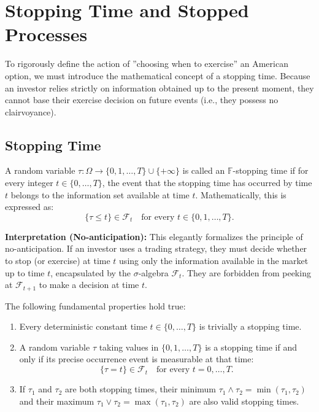 \chapter{Stopping Time and Stopped Processes}

To rigorously define the action of ''choosing when to exercise'' an American option, we must introduce the mathematical concept of a stopping time. Because an investor relies strictly on information obtained up to the present moment, they cannot base their exercise decision on future events (i.e., they possess no clairvoyance).

\section{Stopping Time}

\begin{definition}
A random variable $\tau : \Omega \to \{0, 1, \dots, T\} \cup \{+\infty\}$ is called an $\mathbb{F}$-stopping time if for every integer $t \in \{0, \dots, T\}$, the event that the stopping time has occurred by time $t$ belongs to the information set available at time $t$. Mathematically, this is expressed as:
$$ \{\tau \leq t\} \in \mathcal{F}_t \quad \text{for every } t \in \{0, 1, \dots, T\}. $$
\end{definition}

\textbf{Interpretation (No-anticipation):}
This elegantly formalizes the principle of no-anticipation. If an investor uses a trading strategy, they must decide whether to stop (or exercise) at time $t$ using only the information available in the market up to time $t$, encapsulated by the $\sigma$-algebra $\mathcal{F}_t$. They are forbidden from peeking at $\mathcal{F}_{t+1}$ to make a decision at time $t$.

\begin{proposition}
The following fundamental properties hold true:
\begin{enumerate}[label=(\alph*)]
    \item Every deterministic constant time $t \in \{0, \ldots, T\}$ is trivially a stopping time.
    \item A random variable $\tau$ taking values in $\{0, 1, \dots, T\}$ is a stopping time if and only if its precise occurrence event is measurable at that time:
    $$ \{\tau = t\} \in \mathcal{F}_t \quad \text{for every } t = 0, \ldots, T. $$
    \item If $\tau_1$ and $\tau_2$ are both stopping times, their minimum $\tau_1 \wedge \tau_2 = \min(\tau_1, \tau_2)$ and their maximum $\tau_1 \vee \tau_2 = \max(\tau_1, \tau_2)$ are also valid stopping times.
\end{enumerate}
\end{proposition}

